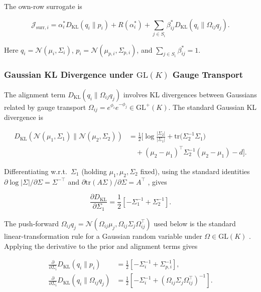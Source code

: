 \documentclass[twoside,11pt]{article}
\begin{document}
The own-row surrogate is

\begin{equation}
\mathcal{J}_{\mathrm{surr},i}
=\alpha_i^*D_{\mathrm{KL}}(q_i\|p_i)
+R(\alpha_i^*)
+\sum_{j\in S_i}\beta_{ij}^*D_{\mathrm{KL}}(q_i\|\Omega_{ij}q_j).
\end{equation}

Here $q_i=\mathcal{N}(\mu_i,\Sigma_i)$, $p_i=\mathcal{N}(\mu_{p,i},\Sigma_{p,i})$, and $\sum_{j\in S_i}\beta_{ij}^*=1$.

\subsubsection{Gaussian KL Divergence under $\mathrm{GL}(K)$ Gauge Transport}

The alignment term $D_{\mathrm{KL}}(q_i \| \Omega_{ij} q_j)$ involves KL divergences between Gaussians related by gauge transport $\Omega_{ij} = e^{\phi_i}e^{-\phi_j} \in \mathrm{GL}^+(K)$. The standard Gaussian KL divergence \citep{Bishop2006,murphy2012machine,CoverThomas2006} is

\begin{align}
D_{\mathrm{KL}} \left(
\mathcal{N}(\mu_1, \Sigma_1)
 \|
\mathcal{N}(\mu_2, \Sigma_2)
\right)
&=
\frac{1}{2}
\Big[
\log \frac{|\Sigma_2|}{|\Sigma_1|}
+ \mathrm{tr} \big(\Sigma_2^{-1}\Sigma_1\big)
\\ &\quad
+ (\mu_2 - \mu_1)^\top
  \Sigma_2^{-1}
  (\mu_2 - \mu_1)
- d
\Big].
\label{eq:gaussian_KL}
\end{align}


Differentiating w.r.t.\ $\Sigma_1$ (holding $\mu_1,\mu_2,\Sigma_2$ fixed), using the standard identities $\partial \log|\Sigma|/\partial \Sigma = \Sigma^{-\top}$ and $\partial \mathrm{tr}(A\Sigma)/\partial \Sigma = A^\top$ \citep{petersen2012matrix}, gives

\begin{equation}
\frac{\partial D_{\mathrm{KL}}}{\partial \Sigma_1}
=\frac{1}{2}\left[
-\Sigma_1^{-1}
+ \Sigma_2^{-1}
\right].
\end{equation}

The push-forward $\Omega_{ij} q_j = \mathcal{N}(\Omega_{ij}\mu_j, \Omega_{ij}\Sigma_j\Omega_{ij}^\top)$ used below is the standard linear-transformation rule for a Gaussian random variable under $\Omega \in \mathrm{GL}(K)$ \citep[\S2.3.3]{Bishop2006}. Applying the derivative to the prior and alignment terms gives

\begin{align}
\frac{\partial}{\partial \Sigma_i}
D_{\mathrm{KL}}(q_i \| p_i)
&=\frac{1}{2}\left[
-\Sigma_i^{-1}
+ \Sigma_{p,i}^{-1}
\right],
\\[6pt]
\frac{\partial}{\partial \Sigma_i}
D_{\mathrm{KL}}(q_i \| \Omega_{ij} q_j)
&=
\frac{1}{2}\left[
-\Sigma_i^{-1}
+ (\Omega_{ij}\Sigma_j\Omega_{ij}^\top)^{-1}
\right].
\end{align}
\end{document}
